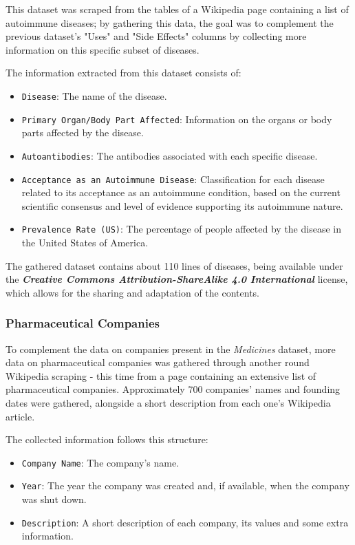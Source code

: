 \documentclass[sigconf]{acmart}
\begin{document}
This dataset was scraped from the tables of a Wikipedia page containing a list of autoimmune diseases\cite{diseases_dataset}; by gathering this data, the goal was to complement the previous dataset's "Uses" and "Side Effects" columns by collecting more information on this specific subset of diseases.

The information extracted from this dataset consists of:
\begin{itemize}
	\item {\texttt{Disease}}: The name of the disease.
	\item {\texttt{Primary Organ/Body Part Affected}}: Information on the organs or body parts affected by the disease.
	\item {\texttt{Autoantibodies}}: The antibodies associated with each specific disease.
	\item {\texttt{Acceptance as an Autoimmune Disease}}: Classification for each disease related to its acceptance as an autoimmune condition, based on the current scientific consensus and level of evidence supporting its autoimmune nature.
	\item {\texttt{Prevalence Rate (US)}}: The percentage of people affected by the disease in the United States of America.
\end{itemize}

The gathered dataset contains about 110 lines of diseases, being available under the \textit{\textbf{Creative Commons Attribution-ShareAlike 4.0 International}}\cite{wikipedia_cc} license, which allows for the sharing and adaptation of the contents.

\subsubsection{Pharmaceutical Companies}

To complement the data on companies present in the \textit{Medicines} dataset, more data on pharmaceutical companies was gathered through another round Wikipedia scraping - this time from a page containing an extensive list of pharmaceutical companies\cite{companies_dataset}. Approximately 700 companies' names and founding dates were gathered, alongside a short description from each one's Wikipedia article.

The collected information follows this structure:
\begin{itemize}
	\item {\texttt{Company Name}}: The company's name.
	\item {\texttt{Year}}: The year the company was created and, if available, when the company was shut down.
	\item {\texttt{Description}}: A short description of each company, its values and some extra information.
\end{itemize}
\end{document}
